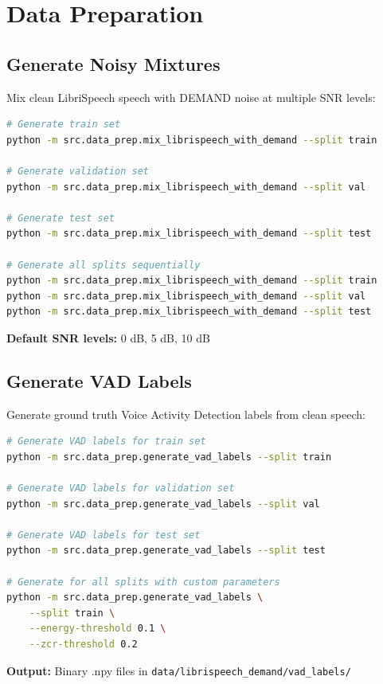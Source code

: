 \documentclass[12pt,a4paper]{article}
\begin{document}
\section{Data Preparation}

\subsection{Generate Noisy Mixtures}

Mix clean LibriSpeech speech with DEMAND noise at multiple SNR levels:

\begin{lstlisting}[language=bash]
# Generate train set
python -m src.data_prep.mix_librispeech_with_demand --split train

# Generate validation set
python -m src.data_prep.mix_librispeech_with_demand --split val

# Generate test set
python -m src.data_prep.mix_librispeech_with_demand --split test

# Generate all splits sequentially
python -m src.data_prep.mix_librispeech_with_demand --split train
python -m src.data_prep.mix_librispeech_with_demand --split val
python -m src.data_prep.mix_librispeech_with_demand --split test
\end{lstlisting}

\textbf{Default SNR levels:} 0 dB, 5 dB, 10 dB

\subsection{Generate VAD Labels}

Generate ground truth Voice Activity Detection labels from clean speech:

\begin{lstlisting}[language=bash]
# Generate VAD labels for train set
python -m src.data_prep.generate_vad_labels --split train

# Generate VAD labels for validation set
python -m src.data_prep.generate_vad_labels --split val

# Generate VAD labels for test set
python -m src.data_prep.generate_vad_labels --split test

# Generate for all splits with custom parameters
python -m src.data_prep.generate_vad_labels \
    --split train \
    --energy-threshold 0.1 \
    --zcr-threshold 0.2
\end{lstlisting}

\textbf{Output:} Binary .npy files in \texttt{data/librispeech\_demand/vad\_labels/}
\end{document}
